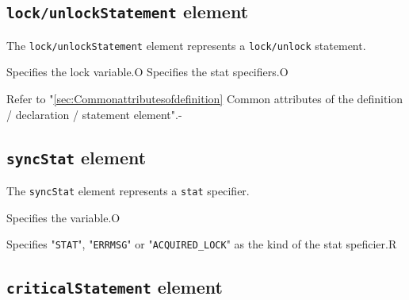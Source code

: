 \subsection{ {\tt lock/unlockStatement} element}

The {\tt lock/unlockStatement} element represents a {\tt lock/unlock} statement.


\begin{XcodeMLChildElements}
{Specifies the lock variable.}{O}
{Specifies the stat specifiers.}{O}
\end{XcodeMLChildElements}

\begin{XcodeMLAttributes}
{Refer to "\ref{sec:Commonattributesofdefinition} Common attributes of the definition / declaration / statement element".}{-}
\end{XcodeMLAttributes}


\subsection{ {\tt syncStat} element}

The {\tt syncStat} element represents a {\tt stat} specifier.


\begin{XcodeMLChildElements}
{Specifies the variable.}{O}
\end{XcodeMLChildElements}

\begin{XcodeMLAttributes}
{Specifies "{\tt STAT}", "{\tt ERRMSG}" or "{\tt ACQUIRED\_LOCK}" as the kind of the stat speficier.}{R}
\end{XcodeMLAttributes}


\subsection{ {\tt criticalStatement} element}

